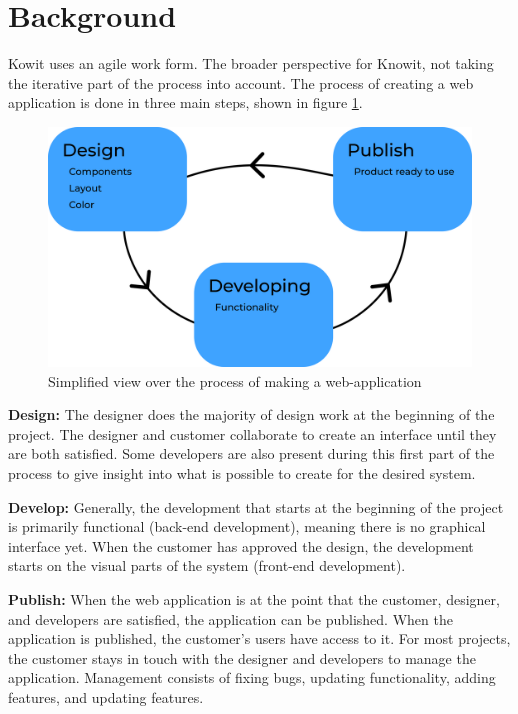 \newpage
\section{Background}
Kowit uses an agile work form. The broader perspective for Knowit, not taking the iterative part of the process into account. The process of creating a web application is done in three main steps, shown in figure \ref{fig:ddp}. 

\begin{figure}[H]
  \centering
  \includegraphics[width=0.8\linewidth]{images/ddp.png}
  \caption{Simplified view over the process of making a web-application}%
  \label{fig:ddp}
\end{figure}


\textbf{Design:} The designer does the majority of design work at the beginning of the project. The designer and customer collaborate to create an interface until they are both satisfied.  Some developers are also present during this first part of the process to give insight into what is possible to create for the desired system.

\textbf{Develop:} Generally, the development that starts at the beginning of the project is primarily functional (back-end development), meaning there is no graphical interface yet. When the customer has approved the design, the development starts on the visual parts of the system (front-end development). 

\textbf{Publish:} When the web application is at the point that the customer, designer, and developers are satisfied, the application can be published. When the application is published, the customer's users have access to it. For most projects, the customer stays in touch with the designer and developers to manage the application. Management consists of fixing bugs, updating functionality, adding features, and updating features.

